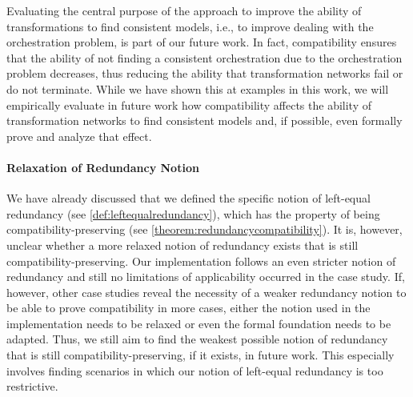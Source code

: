 Evaluating the central purpose of the approach to improve the ability of transformations to find consistent models, i.e., to improve dealing with the orchestration problem, is part of our future work.
In fact, compatibility ensures that the ability of not finding a consistent orchestration due to the orchestration problem decreases, thus reducing the ability that transformation networks fail or do not terminate.
While we have shown this at examples in this work, we will empirically evaluate in future work how compatibility affects the ability of transformation networks to find consistent models and, if possible, even formally prove and analyze that effect. 



\paragraph{Relaxation of Redundancy Notion}
We have already discussed that we defined the specific notion of left-equal redundancy (see \autoref{def:leftequalredundancy}), which has the property of being compatibility-preserving (see \autoref{theorem:redundancycompatibility}).
It is, however, unclear whether a more relaxed notion of redundancy exists that is still compatibility-preserving.
Our implementation follows an even stricter notion of redundancy and still no limitations of applicability occurred in the case study.
If, however, other case studies reveal the necessity of a weaker redundancy notion to be able to prove compatibility in more cases, either the notion used in the implementation needs to be relaxed or even the formal foundation needs to be adapted.
Thus, we still aim to find the weakest possible notion of redundancy that is still compatibility-preserving, if it exists, in future work.
This especially involves finding scenarios in which our notion of left-equal redundancy is too restrictive.


